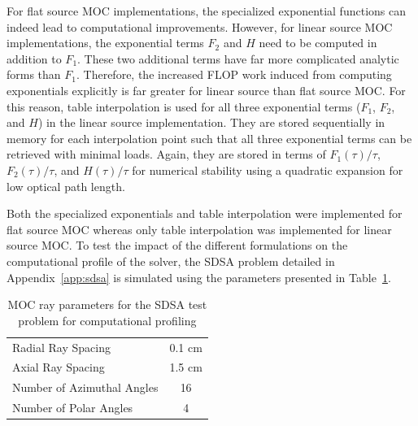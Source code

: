 For flat source \ac{MOC} implementations, the specialized exponential functions can indeed lead to computational improvements. However, for linear source \ac{MOC} implementations, the exponential terms $F_2$ and $H$ need to be computed in addition to $F_1$. These two additional terms have far more complicated analytic forms than $F_1$. Therefore, the increased \ac{FLOP} work induced from computing exponentials explicitly is far greater for linear source than flat source \ac{MOC}. For this reason, table interpolation is used for all three exponential terms ($F_1$, $F_2$, and $H$) in the linear source implementation. They are stored sequentially in memory for each interpolation point such that all three exponential terms can be retrieved with minimal loads. Again, they are stored in terms of $F_1(\tau) / \tau$, $F_2(\tau) / \tau$, and $H(\tau) / \tau$ for numerical stability using a quadratic expansion for low optical path length. 

Both the specialized exponentials and table interpolation were implemented for flat source \ac{MOC} whereas only table interpolation was implemented for linear source \ac{MOC}. To test the impact of the different formulations on the computational profile of the solver, the SDSA problem detailed in Appendix~\ref{app:sdsa} is simulated using the parameters presented in Table~\ref{tab:exp-performance-params}. 

\begin{table}[ht]
	\centering
	\caption{MOC ray parameters for the SDSA test problem for computational profiling}
	\medskip
	\begin{tabular}{lc}
		\hline
		Radial Ray Spacing & 0.1 cm \\
		Axial Ray Spacing & 1.5 cm \\
		Number of Azimuthal Angles & 16 \\
		Number of Polar Angles & 4 \\
		\hline
	\end{tabular}
	\label{tab:exp-performance-params}
\end{table}

